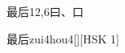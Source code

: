 \begin{entry}{最后}{12,6}{⽈、⼝}
  \begin{phonetics}{最后}{zui4hou4}[][HSK 1]
  \end{phonetics}
\end{entry}
